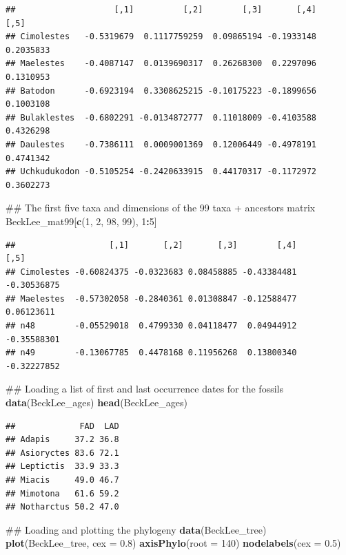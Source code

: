 \documentclass[]{book}
\newenvironment{Shaded}{\begin{snugshade}}{\end{snugshade}}
\newcommand{\KeywordTok}[1]{\textcolor[rgb]{0.13,0.29,0.53}{\textbf{#1}}}
\newcommand{\DataTypeTok}[1]{\textcolor[rgb]{0.13,0.29,0.53}{#1}}
\newcommand{\DecValTok}[1]{\textcolor[rgb]{0.00,0.00,0.81}{#1}}
\newcommand{\FloatTok}[1]{\textcolor[rgb]{0.00,0.00,0.81}{#1}}
\newcommand{\OperatorTok}[1]{\textcolor[rgb]{0.81,0.36,0.00}{\textbf{#1}}}
\newcommand{\NormalTok}[1]{#1}
\theoremstyle{definition}
\theoremstyle{definition}
\theoremstyle{remark}
\begin{document}
\begin{verbatim}
##                    [,1]          [,2]        [,3]       [,4]      [,5]
## Cimolestes   -0.5319679  0.1117759259  0.09865194 -0.1933148 0.2035833
## Maelestes    -0.4087147  0.0139690317  0.26268300  0.2297096 0.1310953
## Batodon      -0.6923194  0.3308625215 -0.10175223 -0.1899656 0.1003108
## Bulaklestes  -0.6802291 -0.0134872777  0.11018009 -0.4103588 0.4326298
## Daulestes    -0.7386111  0.0009001369  0.12006449 -0.4978191 0.4741342
## Uchkudukodon -0.5105254 -0.2420633915  0.44170317 -0.1172972 0.3602273
\end{verbatim}

\begin{Shaded}
\begin{Highlighting}[]
\NormalTok{## The first five taxa and dimensions of the 99 taxa + ancestors matrix}
\NormalTok{BeckLee_mat99[}\KeywordTok{c}\NormalTok{(}\DecValTok{1}\NormalTok{, }\DecValTok{2}\NormalTok{, }\DecValTok{98}\NormalTok{, }\DecValTok{99}\NormalTok{), }\DecValTok{1}\OperatorTok{:}\DecValTok{5}\NormalTok{]}
\end{Highlighting}
\end{Shaded}

\begin{verbatim}
##                   [,1]       [,2]       [,3]        [,4]        [,5]
## Cimolestes -0.60824375 -0.0323683 0.08458885 -0.43384481 -0.30536875
## Maelestes  -0.57302058 -0.2840361 0.01308847 -0.12588477  0.06123611
## n48        -0.05529018  0.4799330 0.04118477  0.04944912 -0.35588301
## n49        -0.13067785  0.4478168 0.11956268  0.13800340 -0.32227852
\end{verbatim}

\begin{Shaded}
\begin{Highlighting}[]
\NormalTok{## Loading a list of first and last occurrence dates for the fossils}
\KeywordTok{data}\NormalTok{(BeckLee_ages)}
\KeywordTok{head}\NormalTok{(BeckLee_ages)}
\end{Highlighting}
\end{Shaded}

\begin{verbatim}
##             FAD  LAD
## Adapis     37.2 36.8
## Asioryctes 83.6 72.1
## Leptictis  33.9 33.3
## Miacis     49.0 46.7
## Mimotona   61.6 59.2
## Notharctus 50.2 47.0
\end{verbatim}

\begin{Shaded}
\begin{Highlighting}[]
\NormalTok{## Loading and plotting the phylogeny}
\KeywordTok{data}\NormalTok{(BeckLee_tree)}
\KeywordTok{plot}\NormalTok{(BeckLee_tree, }\DataTypeTok{cex =} \FloatTok{0.8}\NormalTok{) }
\KeywordTok{axisPhylo}\NormalTok{(}\DataTypeTok{root =} \DecValTok{140}\NormalTok{)}
\KeywordTok{nodelabels}\NormalTok{(}\DataTypeTok{cex =} \FloatTok{0.5}\NormalTok{)}
\end{Highlighting}
\end{Shaded}
\end{document}

